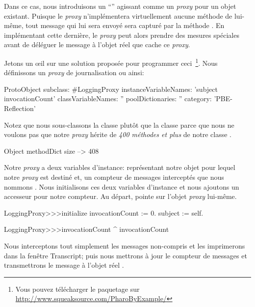 \documentclass[a4paper,10pt,twoside]{book}
\begin{document}
Dans ce cas, nous introduisons un ``''
agissant comme un \emph{proxy} pour un objet existant.
Puisque le \emph{proxy} n'implémentera virtuellement aucune méthode de lui-même, tout message qui lui sera envoyé sera capturé par la méthode
 . En implémentant cette dernière, le \emph{proxy} peut alors prendre des mesures spéciales avant de déléguer le message à l'objet réel que cache ce \emph{proxy}.

Jetons un \oe il sur une solution proposée pour programmer ceci~\footnote{Vous pouvez télécharger le paquetage  sur \url{http://www.squeaksource.com/PharoByExample/}}.
Nous définissons un \emph{proxy} de journalisation ou  ainsi:

\begin{code}{}
ProtoObject subclass: #LoggingProxy
	instanceVariableNames: 'subject invocationCount'
	classVariableNames: ''
	poolDictionaries: ''
	category: 'PBE-Reflection'
\end{code}
Notez que nous sous-classons la classe  plutôt que la classe
 parce que nous ne voulons pas que notre \emph{proxy} hérite de \emph{400 méthodes et plus} de notre classe .

\begin{code}{}
Object methodDict size --> 408
\end{code}

Notre \emph{proxy} a deux variables d'instance:
 représentant notre objet pour lequel notre \emph{proxy} est destiné et, un compteur de messages interceptés que nous nommons .
Nous initialisons ces deux variables d'instance et nous ajoutons un accesseur pour notre compteur.
Au départ,  pointe sur l'objet \emph{proxy} lui-même.

\begin{code}{}
LoggingProxy>>>initialize
	invocationCount := 0.
	subject := self.
\end{code}

\begin{code}{}
LoggingProxy>>>invocationCount
	^ invocationCount
\end{code}

Nous interceptons tout simplement les messages non-compris et les imprimerons dans la fenêtre Transcript; puis nous mettrons à jour le compteur de messages et transmettrons le message à l'objet réel .
\end{document}
